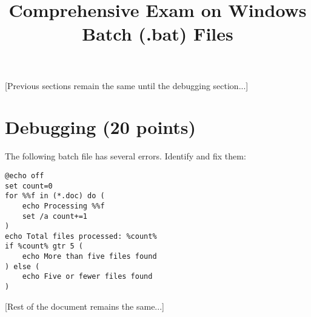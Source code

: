 \documentclass[12pt]{article}
\title{Comprehensive Exam on Windows Batch (.bat) Files}
\author{}
\date{}
\begin{document}
\maketitle

[Previous sections remain the same until the debugging section...]

\section{Debugging (20 points)}

The following batch file has several errors. Identify and fix them:

\begin{lstlisting}[language=batch]
@echo off
set count=0
for %%f in (*.doc) do (
    echo Processing %%f
    set /a count+=1
)
echo Total files processed: %count%
if %count% gtr 5 (
    echo More than five files found
) else (
    echo Five or fewer files found
)
\end{lstlisting}

[Rest of the document remains the same...]
\end{document}
